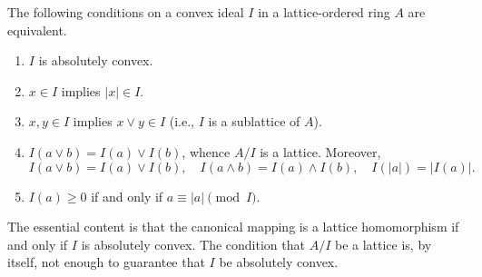 The following conditions on a convex ideal $I$ in a lattice-ordered ring $A$ are equivalent.

\begin{enumerate}
  \item[(1)] $I$ is absolutely convex.
  \item[(2)] $x \in I$ implies $|x| \in I$.
  \item[(3)] $x, y \in I$ implies $x \vee y \in I$ (i.e., $I$ is a sublattice of $A$).
  \item[(4)] $I(a \vee b) = I(a) \vee I(b)$, whence $A/I$ is a lattice. Moreover,
  $$I(a \vee b) = I(a) \vee I(b), \quad I(a \wedge b) = I(a) \wedge I(b), \quad I(|a|) = |I(a)|.$$
  \item[(5)] $I(a) \geq 0$ if and only if $a \equiv |a| \pmod{I}$.
\end{enumerate}

The essential content is that the canonical mapping is a lattice homomorphism if and only if $I$ is absolutely convex. The condition that $A/I$ be a lattice is, by itself, not enough to guarantee that $I$ be absolutely convex.
